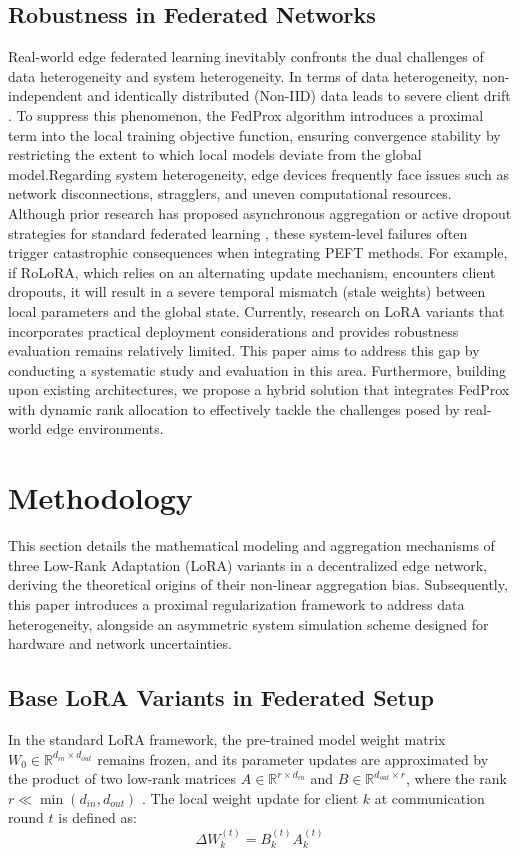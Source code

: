 \documentclass[journal]{IEEEtran}
\begin{document}
\subsection{Robustness in Federated Networks}Real-world edge federated learning inevitably confronts the dual challenges of data heterogeneity and system heterogeneity. In terms of data heterogeneity, non-independent and identically distributed (Non-IID) data leads to severe client drift \cite{zhao2018federated}. To suppress this phenomenon, the FedProx algorithm \cite{li2020federated} introduces a proximal term into the local training objective function, ensuring convergence stability by restricting the extent to which local models deviate from the global model.Regarding system heterogeneity, edge devices frequently face issues such as network disconnections, stragglers, and uneven computational resources. Although prior research has proposed asynchronous aggregation or active dropout strategies for standard federated learning \cite{xie2019asynchronous}, these system-level failures often trigger catastrophic consequences when integrating PEFT methods. For example, if RoLoRA, which relies on an alternating update mechanism, encounters client dropouts, it will result in a severe temporal mismatch (stale weights) between local parameters and the global state. Currently,  research on LoRA variants that incorporates practical deployment considerations and provides robustness evaluation remains relatively limited. This paper aims to address this gap by conducting a systematic study and evaluation in this area. Furthermore, building upon existing architectures, we propose a hybrid solution that integrates FedProx with dynamic rank allocation to effectively tackle the challenges posed by real-world edge environments.


\section{Methodology}
This section details the mathematical modeling and aggregation mechanisms of three Low-Rank Adaptation (LoRA) variants in a decentralized edge network, deriving the theoretical origins of their non-linear aggregation bias. Subsequently, this paper introduces a proximal regularization framework to address data heterogeneity, alongside an asymmetric system simulation scheme designed for hardware and network uncertainties.

\subsection{Base LoRA Variants in Federated Setup}
In the standard LoRA framework, the pre-trained model weight matrix $W_0 \in \mathbb{R}^{d_{in} \times d_{out}}$ remains frozen, and its parameter updates are approximated by the product of two low-rank matrices $A \in \mathbb{R}^{r \times d_{in}}$ and $B \in \mathbb{R}^{d_{out} \times r}$, where the rank $r \ll \min(d_{in}, d_{out})$ \cite{hu2021lora}. The local weight update for client $k$ at communication round $t$ is defined as:
\begin{equation}
\Delta W_k^{(t)} = B_k^{(t)} A_k^{(t)}
\end{equation}
\end{document}
